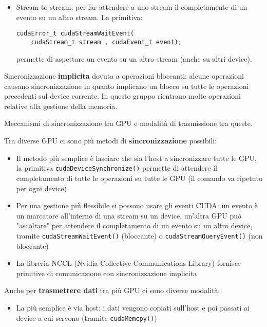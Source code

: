 \begin{questions}
\begin{solution}
\begin{itemize}
            \item Stream-to-stream: per far attendere a uno stream il completamente di un evento su un altro stream. La primitiva:
            \begin{verbatim}
cudaError_t cudaStreamWaitEvent(
    cudaStream_t stream , cudaEvent_t event);
            \end{verbatim}
            permette di aspettare un evento su un altro stream (anche su altri device).
        \end{itemize}
        
        Sincronizzazione \textbf{implicita} dovuta a operazioni bloccanti: alcune operazioni causano sincronizzazione in quanto implicano un blocco su tutte le operazioni precedenti sul device corrente. In questo gruppo rientrano molte operazioni relative alla gestione della memoria.
        
    \end{solution}
    
    \question Meccanismi di sincronizzazione tra GPU e modalità di trasmissione tra queste.
    
    \begin{solution}
        Tra diverse GPU ci sono più metodi di \textbf{sincronizzazione} possibili: 
        \begin{itemize}
            \item Il metodo più semplice è lasciare che sia l'host a sincronizzare tutte le GPU, la primitiva \texttt{cudaDeviceSynchronize()} permette di attendere il completamento di tutte le operazioni su tutte le GPU (il comando va ripetuto per ogni device)
            
            \item Per una gestione più flessibile si possono usare gli eventi CUDA; un evento è un marcatore all'interno di una stream su un device, un'altra GPU può "ascoltare" per attendere il completamento di un evento su un altro device, tramite \texttt{cudaStreamWaitEvent()} (bloccante) o \texttt{cudaStreamQueryEvent()} (non bloccante)
            
            \item La libreria NCCL (Nvidia Collective Communications Library) fornisce primitive di comunicazione con sincronizzazione implicita
        \end{itemize}
        
        Anche per \textbf{trasmettere dati} tra più GPU ci sono diverse modalità:
        \begin{itemize}
            \item La più semplice è via host: i dati vengono copiati sull'host e poi passati ai device a cui servono (tramite \texttt{cudaMemcpy()})
            

\end{itemize}
\end{solution}
\end{questions}
